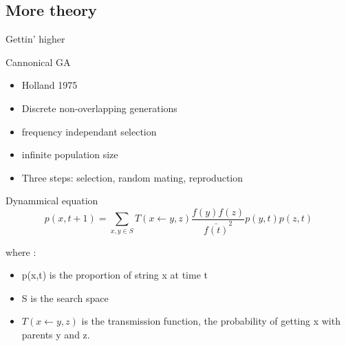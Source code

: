 \subsection{More theory}
\begin{frame}{Gettin' higher}
  \begin{block}{Cannonical GA}
    \begin{itemize}
    \item Holland 1975
    \item Discrete non-overlapping generations
    \item frequency independant selection
    \item infinite population size
    \item Three steps: selection, random mating, reproduction
    \end{itemize}
  \end{block}

  \begin{block}{Dynammical equation}
    $$p(x,t+1) = \sum\limits_{x,y \in S} T(x \leftarrow y,z)
    \frac{f(y)f(z)}{\bar{f(t)}^2}p(y,t)p(z, t)$$

    where : 
    \begin{itemize}
      \item p(x,t) is the proportion of string x at time t
      \item S is the search space
      \item $T(x \leftarrow y,z)$ is the transmission function, the probability of getting x with parents y and z.
    \end{itemize}
  \end{block}
\end{frame}

